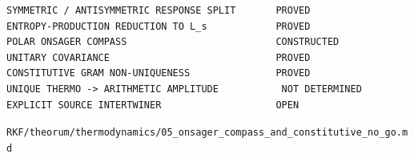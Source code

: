 \begin{verbatim}
SYMMETRIC / ANTISYMMETRIC RESPONSE SPLIT       PROVED
ENTROPY-PRODUCTION REDUCTION TO L_s            PROVED
POLAR ONSAGER COMPASS                          CONSTRUCTED
UNITARY COVARIANCE                             PROVED
CONSTITUTIVE GRAM NON-UNIQUENESS               PROVED
UNIQUE THERMO -> ARITHMETIC AMPLITUDE           NOT DETERMINED
EXPLICIT SOURCE INTERTWINER                    OPEN
\end{verbatim}

\begin{flushright}\small\texttt{RKF/theorum/thermodynamics/05\_onsager\_compass\_and\_constitutive\_no\_go.md}\end{flushright}
